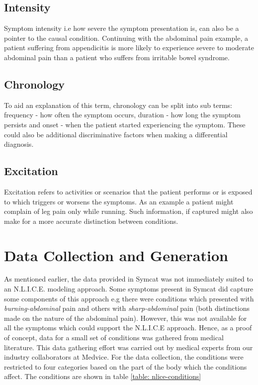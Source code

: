 \subsection*{Intensity}

Symptom intensity i.e how severe the symptom presentation is,  can also be a pointer to the causal condition. Continuing with the abdominal pain example, a patient suffering from appendicitis is more likely to experience severe to moderate abdominal pain than a patient who suffers from irritable bowel syndrome.

\subsection*{Chronology}

To aid an explanation of this term, chronology can be split into sub terms: frequency - how often the symptom occurs, duration - how long the symptom persists and onset - when the patient started experiencing the symptom. These could also be additional discriminative factors when making a differential diagnosis.

\subsection*{Excitation}

Excitation refers to activities or scenarios that the patient performs or is exposed to which triggers or worsens the symptoms. As an example a patient might complain of leg pain only while running. Such information, if captured might also make for a more accurate distinction between conditions.

\section{Data Collection and Generation}

As mentioned earlier, the data provided in Symcat was not immediately suited to an N.L.I.C.E. modeling approach. Some symptoms present in Symcat did capture some components of this approach e.g there were conditions which presented with \textit{burning-abdominal} pain and others with \textit{sharp-abdominal} pain (both distinctions made on the nature of the abdominal pain). However, this was not available for all the symptoms which could support the N.L.I.C.E approach. Hence, as a proof of concept, data for a small set of conditions was gathered from medical literature. This data gathering effort was carried out by medical experts from our industry collaborators at Medvice. For the data collection, the conditions were restricted to four categories based on the part of the body which the conditions affect. The conditions are shown in table \ref{table: nlice-conditions}

